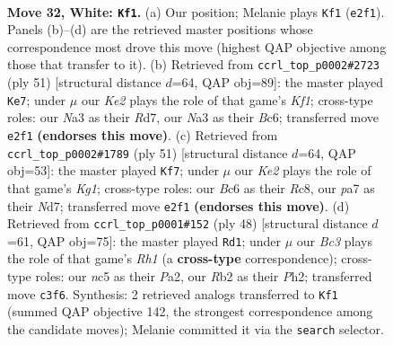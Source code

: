 \documentclass[11pt]{article}
\begin{document}
\clearpage

\begin{figure}[p]\centering
\begin{subfigure}{0.46\textwidth}\centering
\resizebox{\linewidth}{!}{%
\newchessgame
\chessboard[
  setfen={1r3rk1/p4p2/bpB1p1pp/2n5/2P5/N1B1P2P/PR2KPP1/6R1 w - - 9 32},
  showmover=false,
  pgfstyle=straightmove, color=movearrow, markmove={e2-f1}
]}
\caption{}
\end{subfigure}\hfill
\begin{subfigure}{0.46\textwidth}\centering
\resizebox{\linewidth}{!}{%
\newchessgame
\chessboard[
  setfen={1r3k2/3r1p2/2b2np1/p1pp3p/5P1P/P1N1P3/1PRR1PB1/6K1 b - - 1 26},
  showmover=false,
  pgfstyle=straightmove, color=movearrow, markmove={f8-e7}
]}
\caption{}
\end{subfigure}
\\[4pt]
\begin{subfigure}{0.46\textwidth}\centering
\resizebox{\linewidth}{!}{%
\newchessgame
\chessboard[
  setfen={2r1r1k1/p2n2pp/3bp3/B1p5/2Pp1P2/1P1N2P1/P5KP/R3R3 b - - 2 26},
  showmover=false,
  pgfstyle=straightmove, color=movearrow, markmove={g8-f7}
]}
\caption{}
\end{subfigure}\hfill
\begin{subfigure}{0.46\textwidth}\centering
\resizebox{\linewidth}{!}{%
\newchessgame
\chessboard[
  setfen={1r3rk1/2b2ppp/p2p2n1/1p1B4/4P1P1/1RP2N2/PP5P/1K5R w - - 0 25},
  showmover=false,
  pgfstyle=straightmove, color=movearrow, markmove={h1-d1}
]}
\caption{}
\end{subfigure}
\caption{\textbf{Move 32, White: \texttt{Kf1}.} (a) Our position; Melanie plays \texttt{Kf1} (\texttt{e2f1}). Panels (b)--(d) are the retrieved master positions whose correspondence most drove this move (highest QAP objective among those that transfer to it). (b) Retrieved from \texttt{ccrl\_top\_p0002\#2723} (ply 51) [structural distance $d$=64, QAP obj=89]: the master played \texttt{Ke7}; under $\mu$ our \emph{Ke2} plays the role of that game's \emph{Kf1}; cross-type roles: our \emph{N}a3 as their \emph{R}d7, our \emph{N}a3 as their \emph{B}c6; transferred move \texttt{e2f1} \textbf{(endorses this move)}. (c) Retrieved from \texttt{ccrl\_top\_p0002\#1789} (ply 51) [structural distance $d$=64, QAP obj=53]: the master played \texttt{Kf7}; under $\mu$ our \emph{Ke2} plays the role of that game's \emph{Kg1}; cross-type roles: our \emph{B}c6 as their \emph{R}c8, our \emph{p}a7 as their \emph{N}d7; transferred move \texttt{e2f1} \textbf{(endorses this move)}. (d) Retrieved from \texttt{ccrl\_top\_p0001\#152} (ply 48) [structural distance $d$=61, QAP obj=75]: the master played \texttt{Rd1}; under $\mu$ our \emph{Bc3} plays the role of that game's \emph{Rh1} (a \textbf{cross-type} correspondence); cross-type roles: our \emph{n}c5 as their \emph{P}a2, our \emph{R}b2 as their \emph{P}h2; transferred move \texttt{c3f6}. Synthesis: 2 retrieved analogs transferred to \texttt{Kf1} (summed QAP objective 142, the strongest correspondence among the candidate moves); Melanie committed it via the \texttt{search} selector.}
\label{fig:thought-m62}
\end{figure}
\end{document}
